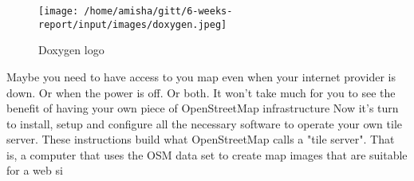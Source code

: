 \newpage
\begin{figure}[ht]

\centering \texttt{[image: /home/amisha/gitt/6-weeks-report/input/images/doxygen.jpeg]}
\caption{Doxygen logo}
\end{figure}
\noindent Maybe you need to have access to you map even when your internet provider is down. Or when the power is off. Or both. It won’t take much for you to see the benefit of having your own piece of OpenStreetMap infrastructure
Now it’s turn to install, setup and configure all the necessary software to operate your own tile server.
These instructions build what OpenStreetMap calls a "tile server". That is, a computer that uses the OSM data set to create map images that are suitable for a web si
 
